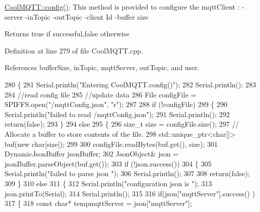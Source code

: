\hyperlink{classCoolMQTT_a6571671781a505feca9a8a56e256c6bc}{Cool\+M\+Q\+T\+T\+::config()}\+: This method is provided to configure the mqtt\+Client \+: -\/server -\/in\+Topic -\/out\+Topic -\/client Id -\/buffer size

\begin{DoxyReturn}{Returns}
true if successful,false otherwise 
\end{DoxyReturn}


Definition at line 279 of file Cool\+M\+Q\+T\+T.\+cpp.



References buffer\+Size, in\+Topic, mqtt\+Server, out\+Topic, and user.


\begin{DoxyCode}
280 \{
281     Serial.println(\textcolor{stringliteral}{"Entering CoolMQTT.config()"});
282     Serial.println();
283 
284     \textcolor{comment}{//read config file}
285     \textcolor{comment}{//update data}
286     File configFile = SPIFFS.open(\textcolor{stringliteral}{"/mqttConfig.json"}, \textcolor{stringliteral}{"r"});
287 
288     \textcolor{keywordflow}{if} (!configFile) 
289     \{
290         Serial.println(\textcolor{stringliteral}{"failed to read /mqttConfig.json"});
291         Serial.println();
292         \textcolor{keywordflow}{return}(\textcolor{keyword}{false});
293     \}
294     \textcolor{keywordflow}{else}
295     \{
296         \textcolor{keywordtype}{size\_t} size = configFile.size();
297         \textcolor{comment}{// Allocate a buffer to store contents of the file.}
298         std::unique\_ptr<char[]> buf(\textcolor{keyword}{new} \textcolor{keywordtype}{char}[size]);
299 
300         configFile.readBytes(buf.get(), size);
301         DynamicJsonBuffer jsonBuffer;
302         JsonObject& json = jsonBuffer.parseObject(buf.get());
303         \textcolor{keywordflow}{if} (!json.success()) 
304         \{
305             Serial.println(\textcolor{stringliteral}{"failed to parse json "});
306             Serial.println();
307             
308             \textcolor{keywordflow}{return}(\textcolor{keyword}{false});
309         \} 
310         \textcolor{keywordflow}{else}
311         \{       
312             Serial.println(\textcolor{stringliteral}{"configuration json is "});
313             json.printTo(Serial);
314             Serial.println();
315     
316             \textcolor{keywordflow}{if}(json[\textcolor{stringliteral}{"mqttServer"}].success() )
317             \{           
318                 \textcolor{keyword}{const} \textcolor{keywordtype}{char}* tempmqttServer = json[\textcolor{stringliteral}{"mqttServer"}]; 

\end{DoxyCode}
